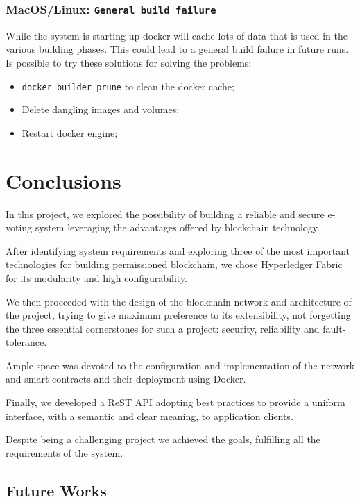 \documentclass{scrartcl}
\begin{document}
\subsubsection*{MacOS/Linux: \texttt{General build failure}}
While the system is starting up docker will cache lots of data that is used in the various building phases. This could lead to a general build failure in future runs. Is possible to try these solutions for solving the problems:
\begin{itemize}
    \item \texttt{docker builder prune} to clean the docker cache;
    \item Delete dangling images and volumes;
    \item Restart docker engine;
\end{itemize}

\section{Conclusions}

In this project, we explored the possibility of building a reliable and secure e-voting system leveraging the advantages offered by blockchain technology.

After identifying system requirements and exploring three of the most important technologies for building permissioned blockchain, we chose Hyperledger Fabric for its modularity and high configurability.

We then proceeded with the design of the blockchain network and architecture of the project, trying to give maximum preference to its extensibility, not forgetting the three essential cornerstones for such a project: security, reliability and fault-tolerance.

Ample space was devoted to the configuration and implementation of the network and smart contracts and their deployment using Docker.

Finally, we developed a ReST API adopting best practices to provide a uniform interface, with a semantic and clear meaning, to application clients.

Despite being a challenging project we achieved the goals, fulfilling all the requirements of the system.

\subsection{Future Works}
\end{document}
